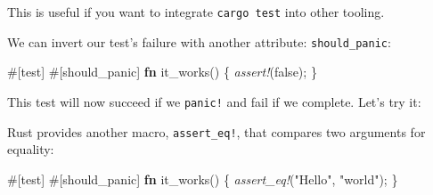 \documentclass[a4paper,]{book}
\newenvironment{Shaded}{\begin{snugshade}}{\end{snugshade}}
\newcommand{\KeywordTok}[1]{\textcolor[rgb]{0.13,0.29,0.53}{\textbf{{#1}}}}
\newcommand{\ConstantTok}[1]{\textcolor[rgb]{0.00,0.00,0.00}{{#1}}}
\newcommand{\StringTok}[1]{\textcolor[rgb]{0.31,0.60,0.02}{{#1}}}
\newcommand{\PreprocessorTok}[1]{\textcolor[rgb]{0.56,0.35,0.01}{\textit{{#1}}}}
\newcommand{\AttributeTok}[1]{\textcolor[rgb]{0.77,0.63,0.00}{{#1}}}
\newcommand{\NormalTok}[1]{{#1}}
\begin{document}
This is useful if you want to integrate \texttt{cargo\ test} into other
tooling.

We can invert our test's failure with another attribute:
\texttt{should\_panic}:

\begin{Shaded}
\begin{Highlighting}[]
\AttributeTok{#[}\NormalTok{test}\AttributeTok{]}
\AttributeTok{#[}\NormalTok{should_panic}\AttributeTok{]}
\KeywordTok{fn} \NormalTok{it_works() \{}
    \PreprocessorTok{assert!}\NormalTok{(}\ConstantTok{false}\NormalTok{);}
\NormalTok{\}}
\end{Highlighting}
\end{Shaded}

This test will now succeed if we \texttt{panic!} and fail if we
complete. Let's try it:

\begin{Shaded}
\end{Shaded}

Rust provides another macro, \texttt{assert\_eq!}, that compares two
arguments for equality:

\begin{Shaded}
\begin{Highlighting}[]
\AttributeTok{#[}\NormalTok{test}\AttributeTok{]}
\AttributeTok{#[}\NormalTok{should_panic}\AttributeTok{]}
\KeywordTok{fn} \NormalTok{it_works() \{}
    \PreprocessorTok{assert_eq!}\NormalTok{(}\StringTok{"Hello"}\NormalTok{, }\StringTok{"world"}\NormalTok{);}
\NormalTok{\}}
\end{Highlighting}
\end{Shaded}
\end{document}

